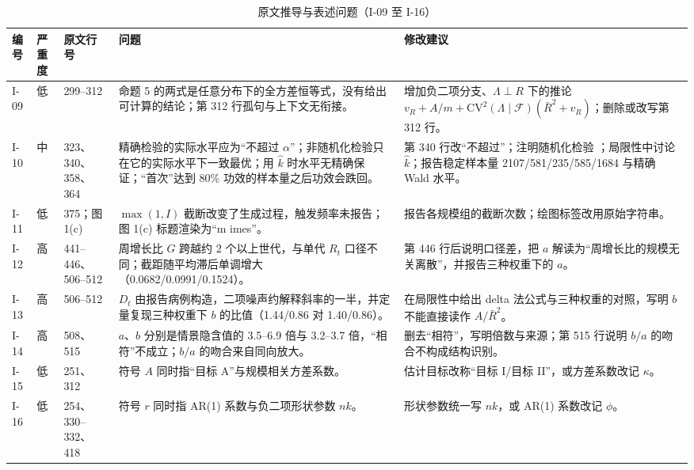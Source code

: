 \begin{table}[!tbp]
\centering
\footnotesize
\caption{原文推导与表述问题（I-09 至 I-16）}
\label{tab:ck-issues-b}
\setlength{\tabcolsep}{3pt}
\begin{tabular}{L{0.9cm}L{0.8cm}L{1.9cm}L{5.6cm}L{5.8cm}}
\toprule
编号 & 严重度 & 原文行号 & 问题 & 修改建议 \\
\midrule
I-09 & 低 & 299--312 & 命题 5 的两式是任意分布下的全方差恒等式，没有给出可计算的结论；第 312 行孤句与上下文无衔接。 & 增加负二项分支、$\Lambda\perp R$ 下的推论 $v_R+A/m+\mathrm{CV}^2(\Lambda\mid\mathcal F)(\bar R^2+v_R)$；删除或改写第 312 行。 \\
I-10 & 中 & 323、340、358、364 & 精确检验的实际水平应为“不超过 $\alpha$”；非随机化检验只在它的实际水平下一致最优；用 $\hat k$ 时水平无精确保证；“首次”达到 80\% 功效的样本量之后功效会跌回。 & 第 340 行改“不超过”；注明随机化检验 \citep{karlin1956theory}；局限性中讨论 $\hat k$；报告稳定样本量 2107/581/235/585/1684 与精确 Wald 水平。 \\
I-11 & 低 & 375；图 1(c) & $\max(1,I)$ 截断改变了生成过程，触发频率未报告；图 1(c) 标题渲染为“m imes”。 & 报告各规模组的截断次数；绘图标签改用原始字符串。 \\
I-12 & 高 & 441--446、506--512 & 周增长比 $G$ 跨越约 2 个以上世代，与单代 $R_t$ 口径不同；截距随平均滞后单调增大（0.0682/0.0991/0.1524）。 & 第 446 行后说明口径差，把 $a$ 解读为“周增长比的规模无关离散”，并报告三种权重下的 $a$。 \\
I-13 & 高 & 506--512 & $D_t$ 由报告病例构造，二项噪声约解释斜率的一半，并定量复现三种权重下 $b$ 的比值（1.44/0.86 对 1.40/0.86）。 & 在局限性中给出 delta 法公式与三种权重的对照，写明 $b$ 不能直接读作 $A/\bar R^2$。 \\
I-14 & 高 & 508、515 & $a$、$b$ 分别是情景隐含值的 3.5--6.9 倍与 3.2--3.7 倍，“相符”不成立；$b/a$ 的吻合来自同向放大。 & 删去“相符”，写明倍数与来源；第 515 行说明 $b/a$ 的吻合不构成结构识别。 \\
I-15 & 低 & 251、312 & 符号 $A$ 同时指“目标 A”与规模相关方差系数。 & 估计目标改称“目标 I/目标 II”，或方差系数改记 $\kappa$。 \\
I-16 & 低 & 254、330--332、418 & 符号 $r$ 同时指 AR(1) 系数与负二项形状参数 $nk$。 & 形状参数统一写 $nk$，或 AR(1) 系数改记 $\phi$。 \\
\bottomrule
\end{tabular}
\end{table}

